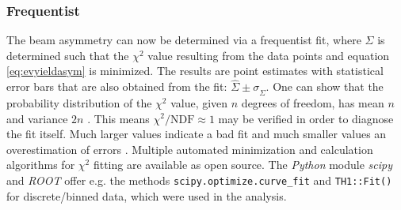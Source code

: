 \subsubsection{Frequentist}
The beam asymmetry can now be determined via a frequentist fit, where $\Sigma$ is determined such that the $\chi^2$ value resulting from the data points and equation \ref{eq:evyieldasym} is minimized. The results are point estimates with statistical error bars that are also obtained from the fit: $\hat{\Sigma}\pm\sigma_{\hat{\Sigma}}$. One can show that the probability distribution of the $\chi^2$ value, given $n$ degrees of freedom, has mean $n$ and variance $2n$ \cite{statistics}. This means $\chi^2/\text{NDF}\approx1$ may be verified in order to diagnose the fit itself. Much larger values indicate a bad fit and much smaller values an overestimation of errors \cite{statistics}. Multiple automated minimization and calculation algorithms for $\chi^2$ fitting are available as open source. The \emph{Python} \cite{python} module \emph{scipy} \cite{scipy} and \emph{ROOT} \cite{root} offer e.g. the methods \texttt{scipy.optimize.curve\_fit} \cite{pFit} and \texttt{TH1::Fit()} \cite{rFit} for discrete/binned data, which were used in the analysis.

